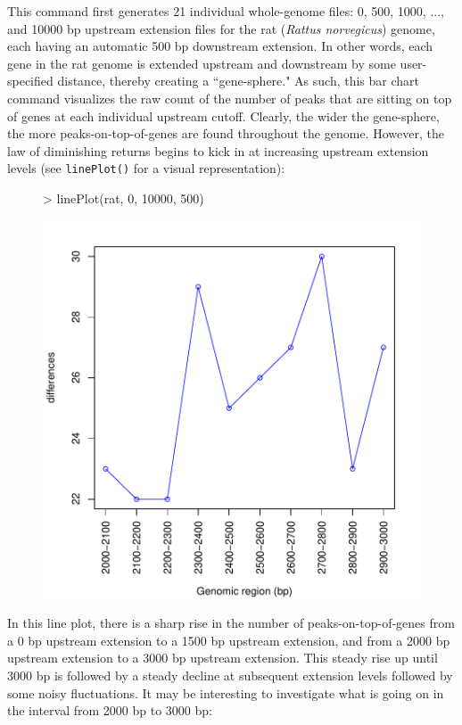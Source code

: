 \documentclass[12pt]{article}
\begin{document}
This command first generates 21 individual whole-genome files: 0, 500, 1000, ..., and 10000 bp upstream extension files for the rat (\emph{Rattus norvegicus}) genome, each having an automatic 500 bp downstream extension.  In other words, each gene in the rat genome is extended upstream and downstream by some user-specified distance, thereby creating a ``gene-sphere."  As such, this bar chart command visualizes the raw count of the number of peaks that are sitting on top of genes at each individual upstream cutoff.  Clearly, the wider the gene-sphere, the more peaks-on-top-of-genes are found throughout the genome.  However, the law of diminishing returns begins to kick in at increasing upstream extension levels (see \texttt{linePlot()} for a visual representation):

\begin{figure}[H]
\begin{center}
\begin{Schunk}
\begin{Sinput}
> linePlot(rat, 0, 10000, 500)
\end{Sinput}
\end{Schunk}
\includegraphics{geneXtendeR-008}
\end{center}
\end{figure}

In this line plot, there is a sharp rise in the number of peaks-on-top-of-genes from a 0 bp upstream extension to a 1500 bp upstream extension, and from a 2000 bp upstream extension to a 3000 bp upstream extension.  This steady rise up until 3000 bp is followed by a steady decline at subsequent extension levels followed by some noisy fluctuations.  It may be interesting to investigate what is going on in the interval from 2000 bp to 3000 bp: 
\end{document}
